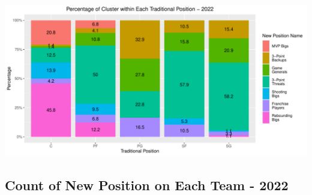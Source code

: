 \documentclass[
]{article}
\begin{document}
\includegraphics{Reclassifying-NBA-Player-Postions-Pt.-3---Clustering-Analysis-Results_files/figure-latex/unnamed-chunk-12-1.pdf}

\hypertarget{count-of-new-position-on-each-team---2022}{%
\subsection{Count of New Position on Each Team -
2022}\label{count-of-new-position-on-each-team---2022}}
\end{document}
